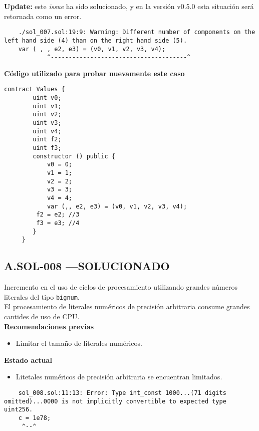 \textbf{Update:} este \textit{issue}\cite{GHI3325} ha sido solucionado, y en la versión v0.5.0 esta situación será retornada como un error.\\

\begin{lstlisting}
    ./sol_007.sol:19:9: Warning: Different number of components on the left hand side (4) than on the right hand side (5).
    var ( , , e2, e3) = (v0, v1, v2, v3, v4);
            ^--------------------------------------^    
\end{lstlisting}
\bigskip

\textbf{Código utilizado para probar nuevamente este caso}
\begin{lstlisting}[language=Solidity]
    contract Values {
        uint v0;
        uint v1;
        uint v2;
        uint v3;
        uint v4;
        uint f2;
        uint f3;
        constructor () public {
            v0 = 0;
            v1 = 1;
            v2 = 2;
            v3 = 3;     
            v4 = 4;
            var (,, e2, e3) = (v0, v1, v2, v3, v4);
         f2 = e2; //3
         f3 = e3; //4
        }  
     }
\end{lstlisting}


\subsection*{A.SOL-008  \color{ForestGreen}—SOLUCIONADO}
Incremento en el uso de ciclos de procesamiento utilizando grandes números literales del tipo \texttt{bignum}.\\

El procesamiento de literales numéricos de precisión arbitraria consume grandes cantides de uso de CPU.\\

\textbf{Recomendaciones previas}
\begin{itemize}
    \item Limitar el tamaño de literales numéricos.
\end{itemize}
\bigskip

\textbf{Estado actual}
\begin{itemize}
    \item Litetales numéricos de precisión arbitraria se encuentran limitados.
\end{itemize}
\begin{lstlisting}
    sol_008.sol:11:13: Error: Type int_const 1000...(71 digits omitted)...0000 is not implicitly convertible to expected type uint256.
    c = 1e78;
	 ^--^
\end{lstlisting}
\bigskip

